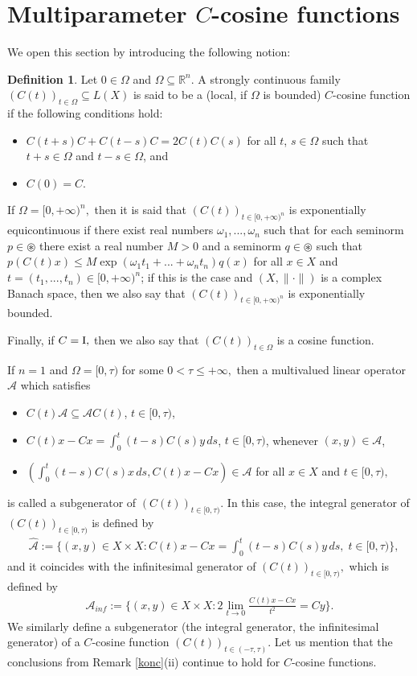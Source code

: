 \documentclass{amsart}
\theoremstyle{definition}
\newtheorem{defn}[thm]{Definition}
\theoremstyle{remark}
\numberwithin{equation}{section}
\begin{document}
\section{Multiparameter $C$-cosine functions}\label{ccos}

We open this section by introducing the following notion:

\begin{defn}\label{1.2.1.1.1}
Let $0\in \Omega$ and $\Omega  \subseteq {\mathbb R}^{n}.$ A strongly continuous family
$(C(t))_{t\in \Omega}\subseteq L(X)$ 
is said to be a (local, if $\Omega$ is bounded) $C$-cosine function if the following conditions hold:
\begin{itemize}
\item[(i)] $C(t+s)C+C(t-s)C=2C(t)C(s)$ for all $t$, $s\in \Omega$ such that $t+s \in \Omega$ and $t-s\in \Omega$, and
\item[(ii)] $C(0)=C$.
\end{itemize}
If $\Omega=[0,+\infty)^{n},$ then it is said that $(C(t))_{t\in [0,+\infty)^{n}}$ is exponentially equicontinuous if there exist real numbers $\omega_{1},...,\omega_{n}$ such that for each seminorm $p\in \circledast$ there exist a real number $M>0$ and a seminorm $q\in \circledast$ such that $p(C(t)x)\leq M\exp(\omega_{1}t_{1}+...+\omega_{n}t_{n})q(x)$ for all $x\in X$ and $t=(t_{1},...,t_{n})\in [0,+\infty)^{n} $; if this is the case and $(X,\| \cdot \|)$ is a complex Banach space, then we also say that  $(C(t))_{t\in [0,+\infty)^{n}}$ is exponentially bounded.

Finally, if $C={\rm I}, $ then we also say that $(C(t))_{t\in \Omega}$ is a cosine function.
\end{defn}

If $n=1$ and $\Omega=[0,\tau)$ for some $0<\tau \leq +\infty,$ then a multivalued linear operator ${\mathcal A}$ which satisfies
\begin{itemize}
\item[(a)] $C(t){\mathcal A}\subseteq {\mathcal A}C(t)$, $t\in[0,\tau)$,
\item[(b)] $C(t)x-Cx=\int_0^t(t-s)C(s)y\,ds $,
$t\in[0,\tau)$, whenever $(x,y)\in {\mathcal A}$, 
\item[(c)] $(\int_0^t(t-s)C(s)x\,ds ,C(t)x-Cx )\in {\mathcal A}$ for all $x\in X$ and $t\in [0,\tau),$
\end{itemize}
is called a subgenerator of $(C(t))_{t\in[0,\tau)}$. In this case, the integral generator of $(C(t))_{t\in[0,\tau)}$ is defined by
\begin{align*}
&\hat{{\mathcal A}}:=\biggl\{(x,y)\in X\times X:C(t)x-Cx=\int_0^t(t-s)C(s)y\,ds,\;t\in[0,\tau)\biggr\},
\end{align*}
and it coincides with the infinitesimal generator of $(C(t))_{t\in[0,\tau)},$ which is defined by
\begin{align*}
{\mathcal A}_{inf} :=\Biggl\{ ( x,y) \in X \times X : 2\lim_{t\rightarrow 0}\frac{C(t)x-Cx}{t^{2}}=Cy\Biggr\}.
\end{align*}
We similarly define a subgenerator (the integral generator, the infinitesimal generator) of a $C$-cosine function $(C(t))_{t\in (-\tau,\tau)}$. Let us mention that
the conclusions from Remark \ref{konc}(ii) continue to hold for $C$-cosine functions.
\end{document}
